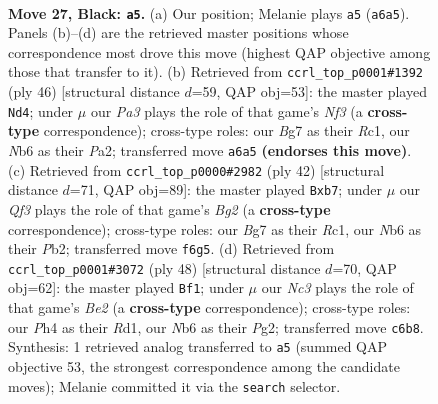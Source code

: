 \documentclass[11pt]{article}
\begin{document}
\clearpage

\begin{figure}[p]\centering
\begin{subfigure}{0.46\textwidth}\centering
\resizebox{\linewidth}{!}{%
\newchessgame
\chessboard[
  setfen={r5k1/1p3pb1/pnn2qp1/3p4/3P3p/1B5P/PP3PPB/RN2Q1K1 b - - 1 27},
  showmover=false,
  pgfstyle=straightmove, color=movearrow, markmove={a6-a5}
]}
\caption{}
\end{subfigure}\hfill
\begin{subfigure}{0.46\textwidth}\centering
\resizebox{\linewidth}{!}{%
\newchessgame
\chessboard[
  setfen={5rk1/1b2qpp1/1p1b3p/p2p4/8/1PQ1PN1B/P4PPP/2R3K1 w - - 0 24},
  showmover=false,
  pgfstyle=straightmove, color=movearrow, markmove={f3-d4}
]}
\caption{}
\end{subfigure}
\\[4pt]
\begin{subfigure}{0.46\textwidth}\centering
\resizebox{\linewidth}{!}{%
\newchessgame
\chessboard[
  setfen={3qb1k1/1p3pp1/4p2p/r1b5/p7/P1N1P1P1/1PQ2PBP/2R3K1 w - - 0 22},
  showmover=false,
  pgfstyle=straightmove, color=movearrow, markmove={g2-b7}
]}
\caption{}
\end{subfigure}\hfill
\begin{subfigure}{0.46\textwidth}\centering
\resizebox{\linewidth}{!}{%
\newchessgame
\chessboard[
  setfen={2r3k1/1p1b1p1p/p2q2p1/3p4/3N4/bP2PQ1P/P3BPP1/3R2K1 w - - 4 25},
  showmover=false,
  pgfstyle=straightmove, color=movearrow, markmove={e2-f1}
]}
\caption{}
\end{subfigure}
\caption{\textbf{Move 27, Black: \texttt{a5}.} (a) Our position; Melanie plays \texttt{a5} (\texttt{a6a5}). Panels (b)--(d) are the retrieved master positions whose correspondence most drove this move (highest QAP objective among those that transfer to it). (b) Retrieved from \texttt{ccrl\_top\_p0001\#1392} (ply 46) [structural distance $d$=59, QAP obj=53]: the master played \texttt{Nd4}; under $\mu$ our \emph{Pa3} plays the role of that game's \emph{Nf3} (a \textbf{cross-type} correspondence); cross-type roles: our \emph{B}g7 as their \emph{R}c1, our \emph{N}b6 as their \emph{P}a2; transferred move \texttt{a6a5} \textbf{(endorses this move)}. (c) Retrieved from \texttt{ccrl\_top\_p0000\#2982} (ply 42) [structural distance $d$=71, QAP obj=89]: the master played \texttt{Bxb7}; under $\mu$ our \emph{Qf3} plays the role of that game's \emph{Bg2} (a \textbf{cross-type} correspondence); cross-type roles: our \emph{B}g7 as their \emph{R}c1, our \emph{N}b6 as their \emph{P}b2; transferred move \texttt{f6g5}. (d) Retrieved from \texttt{ccrl\_top\_p0001\#3072} (ply 48) [structural distance $d$=70, QAP obj=62]: the master played \texttt{Bf1}; under $\mu$ our \emph{Nc3} plays the role of that game's \emph{Be2} (a \textbf{cross-type} correspondence); cross-type roles: our \emph{P}h4 as their \emph{R}d1, our \emph{N}b6 as their \emph{P}g2; transferred move \texttt{c6b8}. Synthesis: 1 retrieved analog transferred to \texttt{a5} (summed QAP objective 53, the strongest correspondence among the candidate moves); Melanie committed it via the \texttt{search} selector.}
\label{fig:thought-m53}
\end{figure}
\end{document}
